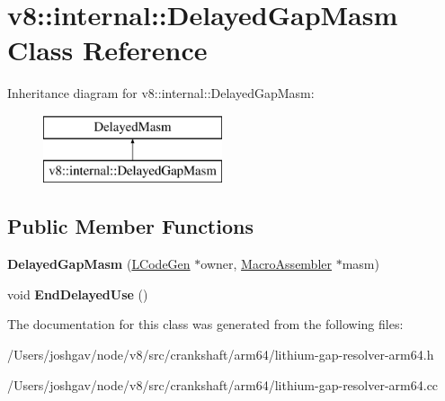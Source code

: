 \hypertarget{classv8_1_1internal_1_1_delayed_gap_masm}{}\section{v8\+:\+:internal\+:\+:Delayed\+Gap\+Masm Class Reference}
\label{classv8_1_1internal_1_1_delayed_gap_masm}
Inheritance diagram for v8\+:\+:internal\+:\+:Delayed\+Gap\+Masm\+:\begin{figure}[H]
\begin{center}
\leavevmode
\includegraphics[height=2.000000cm]{classv8_1_1internal_1_1_delayed_gap_masm}
\end{center}
\end{figure}
\subsection*{Public Member Functions}
\begin{DoxyCompactItemize}
\item 
{\bfseries Delayed\+Gap\+Masm} (\hyperlink{classv8_1_1internal_1_1_l_code_gen}{L\+Code\+Gen} $\ast$owner, \hyperlink{classv8_1_1internal_1_1_macro_assembler}{Macro\+Assembler} $\ast$masm)\hypertarget{classv8_1_1internal_1_1_delayed_gap_masm_a4311d8acb32ff9874eb8de7136f09520}{}\label{classv8_1_1internal_1_1_delayed_gap_masm_a4311d8acb32ff9874eb8de7136f09520}

\item 
void {\bfseries End\+Delayed\+Use} ()\hypertarget{classv8_1_1internal_1_1_delayed_gap_masm_a01c8ddb4c83a4721d9a8c66733713d38}{}\label{classv8_1_1internal_1_1_delayed_gap_masm_a01c8ddb4c83a4721d9a8c66733713d38}

\end{DoxyCompactItemize}


The documentation for this class was generated from the following files\+:\begin{DoxyCompactItemize}
\item 
/\+Users/joshgav/node/v8/src/crankshaft/arm64/lithium-\/gap-\/resolver-\/arm64.\+h\item 
/\+Users/joshgav/node/v8/src/crankshaft/arm64/lithium-\/gap-\/resolver-\/arm64.\+cc\end{DoxyCompactItemize}
